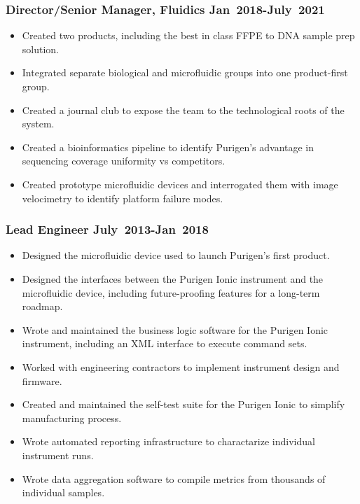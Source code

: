 \documentclass{res}
\begin{document}
\begin{resume}
    \subsubsection{Director/Senior Manager, Fluidics \> Jan~2018-July~2021}
       \begin{itemize}
        \item Created two products, including the best in class FFPE to DNA sample prep solution.
        \item Integrated separate biological and microfluidic groups into one product-first group.
        \item Created a journal club to expose the team to the technological roots of the system.
        \item Created a bioinformatics pipeline to identify Purigen's advantage in sequencing coverage uniformity vs competitors.
        \item Created prototype microfluidic devices and interrogated them with image velocimetry to identify platform failure modes.
       \end{itemize}

    \subsubsection{Lead Engineer \> July~2013-Jan~2018}
      \begin{itemize}
        \item Designed the microfluidic device used to launch Purigen's first product.
        \item Designed the interfaces between the Purigen Ionic instrument and the microfluidic device, including future-proofing features for a long-term roadmap.
        \item Wrote and maintained the business logic software for the Purigen Ionic instrument, including an XML interface to execute command sets.
        \item Worked with engineering contractors to implement instrument design and firmware.
        \item Created and maintained the self-test suite for the Purigen Ionic to simplify manufacturing process.
        \item Wrote automated reporting infrastructure to charactarize individual instrument runs.
        \item Wrote data aggregation software to compile metrics from thousands of individual samples.
      \end{itemize}


\end{resume}
\end{document}
